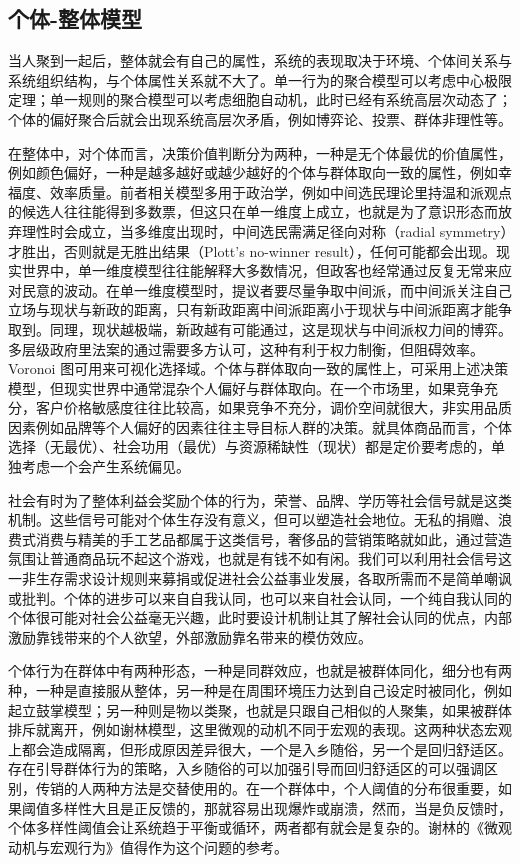 \documentclass[]{tufte-book}
\begin{document}
\hypertarget{ux4e2aux4f53-ux6574ux4f53ux6a21ux578b}{%
\subsection{个体-整体模型}\label{ux4e2aux4f53-ux6574ux4f53ux6a21ux578b}}

当人聚到一起后，整体就会有自己的属性，系统的表现取决于环境、个体间关系与系统组织结构，与个体属性关系就不大了。单一行为的聚合模型可以考虑中心极限定理；单一规则的聚合模型可以考虑细胞自动机，此时已经有系统高层次动态了；个体的偏好聚合后就会出现系统高层次矛盾，例如博弈论、投票、群体非理性等。

在整体中，对个体而言，决策价值判断分为两种，一种是无个体最优的价值属性，例如颜色偏好，一种是越多越好或越少越好的个体与群体取向一致的属性，例如幸福度、效率质量。前者相关模型多用于政治学，例如中间选民理论里持温和派观点的候选人往往能得到多数票，但这只在单一维度上成立，也就是为了意识形态而放弃理性时会成立，当多维度出现时，中间选民需满足径向对称（radial symmetry）才胜出，否则就是无胜出结果（Plott's no-winner result），任何可能都会出现。现实世界中，单一维度模型往往能解释大多数情况，但政客也经常通过反复无常来应对民意的波动。在单一维度模型时，提议者要尽量争取中间派，而中间派关注自己立场与现状与新政的距离，只有新政距离中间派距离小于现状与中间派距离才能争取到。同理，现状越极端，新政越有可能通过，这是现状与中间派权力间的博弈。多层级政府里法案的通过需要多方认可，这种有利于权力制衡，但阻碍效率。Voronoi 图可用来可视化选择域。个体与群体取向一致的属性上，可采用上述决策模型，但现实世界中通常混杂个人偏好与群体取向。在一个市场里，如果竞争充分，客户价格敏感度往往比较高，如果竞争不充分，调价空间就很大，非实用品质因素例如品牌等个人偏好的因素往往主导目标人群的决策。就具体商品而言，个体选择（无最优）、社会功用（最优）与资源稀缺性（现状）都是定价要考虑的，单独考虑一个会产生系统偏见。

社会有时为了整体利益会奖励个体的行为，荣誉、品牌、学历等社会信号就是这类机制。这些信号可能对个体生存没有意义，但可以塑造社会地位。无私的捐赠、浪费式消费与精美的手工艺品都属于这类信号，奢侈品的营销策略就如此，通过营造氛围让普通商品玩不起这个游戏，也就是有钱不如有闲。我们可以利用社会信号这一非生存需求设计规则来募捐或促进社会公益事业发展，各取所需而不是简单嘲讽或批判。个体的进步可以来自自我认同，也可以来自社会认同，一个纯自我认同的个体很可能对社会公益毫无兴趣，此时要设计机制让其了解社会认同的优点，内部激励靠钱带来的个人欲望，外部激励靠名带来的模仿效应。

个体行为在群体中有两种形态，一种是同群效应，也就是被群体同化，细分也有两种，一种是直接服从整体，另一种是在周围环境压力达到自己设定时被同化，例如起立鼓掌模型；另一种则是物以类聚，也就是只跟自己相似的人聚集，如果被群体排斥就离开，例如谢林模型，这里微观的动机不同于宏观的表现。这两种状态宏观上都会造成隔离，但形成原因差异很大，一个是入乡随俗，另一个是回归舒适区。存在引导群体行为的策略，入乡随俗的可以加强引导而回归舒适区的可以强调区别，传销的人两种方法是交替使用的。在一个群体中，个人阈值的分布很重要，如果阈值多样性大且是正反馈的，那就容易出现爆炸或崩溃，然而，当是负反馈时，个体多样性阈值会让系统趋于平衡或循环，两者都有就会是复杂的。谢林的《微观动机与宏观行为》值得作为这个问题的参考。
\end{document}
